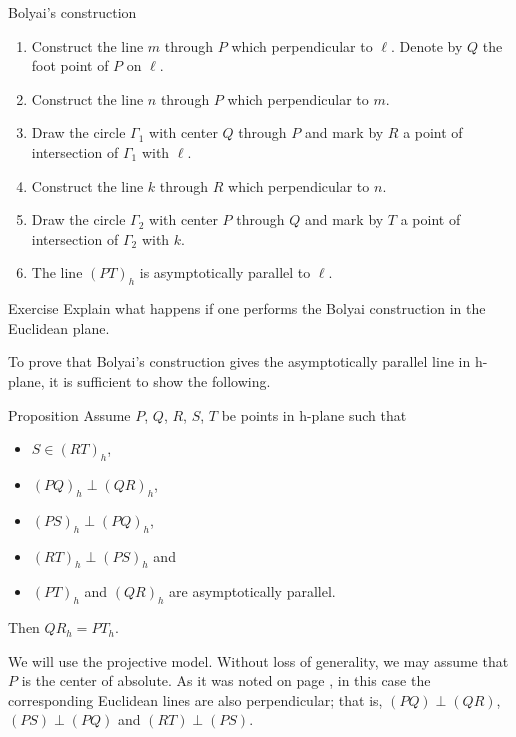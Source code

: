 \begin{thm}{Bolyai's construction}
\begin{enumerate}
\item Construct the line $m$ through $P$ which perpendicular  to $\ell$. 
Denote by $Q$ the foot point of $P$ on $\ell$.
\item Construct the line $n$ through $P$ which perpendicular  to $m$.
\item Draw the circle $\Gamma_1$ with center $Q$ through $P$ and mark by $R$ a point of intersection of $\Gamma_1$ with $\ell$.
\item Construct the line $k$ through $R$ which perpendicular  to $n$. 
\item Draw the circle $\Gamma_2$ with center $P$ through $Q$ and mark by $T$ a point of intersection of $\Gamma_2$ with $k$.
\item The line $(PT)_h$ is asymptotically parallel to $\ell$.
\end{enumerate}
\end{thm}

\begin{thm}{Exercise}\label{ex:Boyai-in-Euclid}
Explain what happens if one performs the Bolyai construction in the Euclidean plane.
\end{thm}

To prove that Bolyai's construction gives the asymptotically parallel line in h-plane,
it is sufficient to show the following.

\begin{thm}{Proposition}\label{prop:boyai}
Assume $P$, $Q$, $R$, $S$, $T$ be points in h-plane
such that 
\begin{itemize}
\item $S\in (RT)_h$,
\item $(PQ)_h\perp (QR)_h$,
\item $(PS)_h\perp(PQ)_h$,
\item $(RT)_h\perp (PS)_h$ and 
\item $(PT)_h$ and $(QR)_h$ are asymptotically parallel.
\end{itemize}
Then $QR_h=PT_h$.
\end{thm}


We will use the projective model.
Without loss of generality, we may assume that $P$ is the center of absolute.
As it was noted on page \pageref{klein-angles},
in this case the corresponding Euclidean lines are also perpendicular;
that is, $(PQ)\perp (QR)$, $(PS)\perp(PQ)$ and $(RT)\perp (PS)$.

